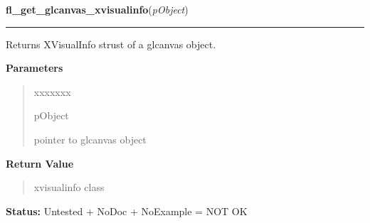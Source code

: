     \label{xformslib:library:fl_get_glcanvas_xvisualinfo}

    \vspace{0.5ex}

\hspace{.8\funcindent}\begin{boxedminipage}{\funcwidth}

    \raggedright \textbf{fl\_get\_glcanvas\_xvisualinfo}(\textit{pObject})

    \vspace{-1.5ex}

    \rule{\textwidth}{0.5\fboxrule}
\setlength{\parskip}{2ex}
    Returns XVisualInfo strust of a glcanvas object.

\setlength{\parskip}{1ex}
      \textbf{Parameters}
      \vspace{-1ex}

      \begin{quote}
        \begin{Ventry}{xxxxxxx}

          \item[pObject]

          pointer to glcanvas object

        \end{Ventry}

      \end{quote}

      \textbf{Return Value}
    \vspace{-1ex}

      \begin{quote}
      xvisualinfo class

      \end{quote}

\textbf{Status:} Untested + NoDoc + NoExample = NOT OK



    \end{boxedminipage}

    \label{xformslib:library:fl_get_glcanvas_context}

    \vspace{0.5ex}

